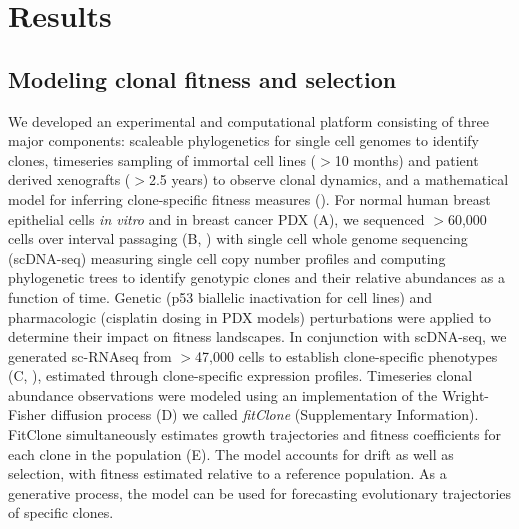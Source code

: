 \section*{Results}
\subsection*{Modeling clonal fitness and selection}
We developed an experimental and computational platform consisting of three major components: scaleable phylogenetics for single cell genomes to identify clones, timeseries sampling of immortal cell lines ($>$10 months) and patient derived xenografts ($>$2.5 years) to observe clonal dynamics, and a mathematical model for inferring clone-specific fitness measures  ().  For normal human breast epithelial cells\cite{Burleigh2015-fk} \emph{in vitro} and in breast cancer PDX\cite{Eirew2015-sg,Bruna2016-ie} (A), we sequenced $>$60,000 cells over interval passaging (B, ) with single cell whole genome sequencing\cite{Laks2019-dm} (scDNA-seq) measuring single cell copy number profiles and computing phylogenetic trees to identify genotypic clones and their relative abundances as a function of time. Genetic (p53 biallelic inactivation for cell lines) and pharmacologic (cisplatin dosing in PDX models) perturbations were applied to determine their impact on fitness landscapes. In conjunction with scDNA-seq, we generated sc-RNAseq from $>$47,000 cells to establish clone-specific phenotypes (C, ), estimated through clone-specific expression profiles. Timeseries clonal abundance observations were modeled using an implementation of the Wright-Fisher diffusion process (D) we called \textit{fitClone} (Supplementary Information). FitClone simultaneously estimates growth trajectories and fitness coefficients for each clone in the population (E). The model accounts for drift as well as selection, with fitness estimated relative to a reference population. As a generative process, the model can be used for forecasting evolutionary trajectories of specific clones. 

